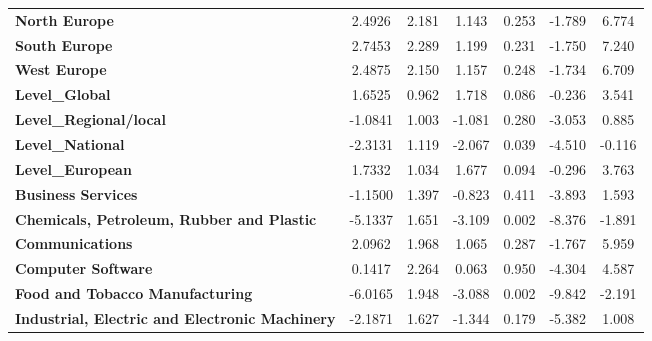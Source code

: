 \documentclass[ 11pt]{article}
\begin{document}
\begin{center}
\begin{tabular}{lcccccc}
\textbf{North Europe}                                  &       2.4926  &        2.181     &     1.143  &         0.253        &       -1.789    &        6.774     \\
\textbf{South Europe}                                  &       2.7453  &        2.289     &     1.199  &         0.231        &       -1.750    &        7.240     \\
\textbf{West Europe}                                   &       2.4875  &        2.150     &     1.157  &         0.248        &       -1.734    &        6.709     \\
\textbf{Level\_Global}                                 &       1.6525  &        0.962     &     1.718  &         0.086        &       -0.236    &        3.541     \\
\textbf{Level\_Regional/local}                         &      -1.0841  &        1.003     &    -1.081  &         0.280        &       -3.053    &        0.885     \\
\textbf{Level\_National}                               &      -2.3131  &        1.119     &    -2.067  &         0.039        &       -4.510    &       -0.116     \\
\textbf{Level\_European}                               &       1.7332  &        1.034     &     1.677  &         0.094        &       -0.296    &        3.763     \\
\textbf{Business Services}                             &      -1.1500  &        1.397     &    -0.823  &         0.411        &       -3.893    &        1.593     \\
\textbf{Chemicals, Petroleum, Rubber and Plastic}      &      -5.1337  &        1.651     &    -3.109  &         0.002        &       -8.376    &       -1.891     \\
\textbf{Communications}                                &       2.0962  &        1.968     &     1.065  &         0.287        &       -1.767    &        5.959     \\
\textbf{Computer Software}                             &       0.1417  &        2.264     &     0.063  &         0.950        &       -4.304    &        4.587     \\
\textbf{Food and Tobacco Manufacturing}                &      -6.0165  &        1.948     &    -3.088  &         0.002        &       -9.842    &       -2.191     \\
\textbf{Industrial, Electric and Electronic Machinery} &      -2.1871  &        1.627     &    -1.344  &         0.179        &       -5.382    &        1.008     \\

\end{tabular}
\end{center}
\end{document}
